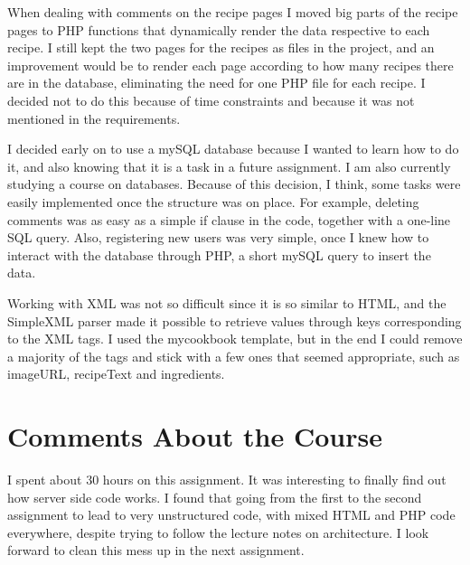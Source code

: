 \documentclass[a4paper]{scrreprt}
\begin{document}
When dealing with comments on the recipe pages I moved big parts of the recipe pages to PHP functions that dynamically render the data respective to each recipe. I still kept the two pages for the recipes as files in the project, and an improvement would be to render each page according to how many recipes there are in the database, eliminating the need for one PHP file for each recipe. I decided not to do this because of time constraints and because it was not mentioned in the requirements.

I decided early on to use a mySQL database because I wanted to learn how to do it, and also knowing that it is a task in a future assignment. I am also currently studying a course on databases. Because of this decision, I think, some tasks were easily implemented once the structure was on place. For example, deleting comments was as easy as a simple if clause in the code, together with a one-line SQL query. Also, registering new users was very simple, once I knew how to interact with the database through PHP, a short mySQL query to insert the data.

Working with XML was not so difficult since it is so similar to HTML, and the SimpleXML parser made it possible to retrieve values through keys corresponding to the XML tags. I used the mycookbook template, but in the end I could remove a majority of the tags and stick with a few ones that seemed appropriate, such as imageURL, recipeText and ingredients.

\chapter{Comments About the Course}

I spent about 30 hours on this assignment. It was interesting to finally find out how server side code works. I found that going from the first to the second assignment to lead to very unstructured code, with mixed HTML and PHP code everywhere, despite trying to follow the lecture notes on architecture. I look forward to clean this mess up in the next assignment.
\end{document}
